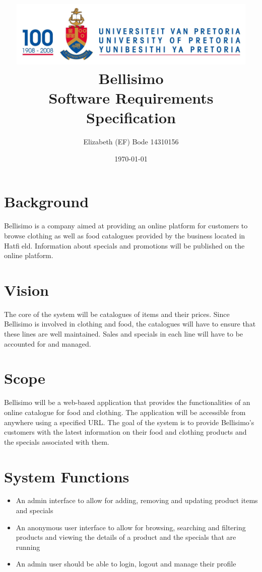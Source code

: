\documentclass[a4paper,10pt]{article}
\title{\includegraphics[width=12cm]{Eeufeeslogo.jpg} \\       
      \bfseries Bellisimo \\
       \vspace{1.0cm}
       Software Requirements Specification \\ 
       \vspace{0.5cm}
       }
\date{\today}
\author{Elizabeth (EF) Bode			14310156}
\begin{document}
\maketitle
\thispagestyle{empty}

\newpage
{}
\thispagestyle{empty}
\tableofcontents
\clearpage

\newpage
{}

\section{Background}
Bellisimo is a company aimed at providing an online platform for customers to browse clothing as well as food catalogues provided by the business located in Hatfield. Information about specials and promotions will be published on the online platform.

\section{Vision}
The core of the system will be catalogues of items and their prices. Since Bellisimo is involved in clothing and food, the catalogues will have to ensure that these lines are well maintained. Sales and specials in each line will have to be accounted for and managed.

\section{Scope}
Bellisimo will be a web-based application that provides the functionalities of an online catalogue for food and clothing. The application will be accessible from anywhere using a specified URL. The goal of the system is to provide Bellisimo’s customers with the latest information on their food and clothing products and the specials associated with them.

\section{System Functions}
\begin{itemize}
	\item An admin interface to allow for adding, removing and updating product items and specials
	\item An anonymous user interface to allow for browsing, searching and filtering products and viewing the details of a product and the specials that are running
	\item An admin user should be able to login, logout and manage their profile
\end{itemize}
\end{document}

